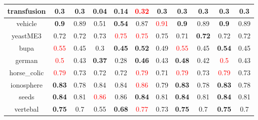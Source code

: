 \documentclass{article}%
\begin{document}
\begin{tabular}{c|cccccccccc}
\hline%
transfusion&0.3&0.3&0.04&\textbf{0.14}&\textcolor{red}{ 
0.32
}&0.3&0.3&0.3&0.3&0.3\\%
\hline%
vehicle&\textbf{0.9}&0.89&0.51&\textbf{0.54}&0.87&\textcolor{red}{ 
0.91
}&\textbf{0.9}&0.89&\textbf{0.9}&0.89\\%
\hline%
yeastME3&0.72&0.72&0.73&\textcolor{red}{ 
0.75
}&\textcolor{red}{ 
0.75
}&0.75&0.71&\textbf{0.72}&0.72&0.72\\%
\hline%
bupa&\textcolor{red}{ 
0.55
}&0.45&0.3&\textbf{0.45}&\textbf{0.52}&0.49&\textcolor{red}{ 
0.55
}&0.45&\textbf{0.54}&0.45\\%
\hline%
german&\textcolor{red}{ 
0.5
}&0.43&\textbf{0.37}&0.28&\textbf{0.46}&0.43&\textbf{0.48}&0.42&\textcolor{red}{ 
0.5
}&0.43\\%
\hline%
horse\_colic&\textcolor{red}{ 
0.79
}&0.73&0.72&0.72&\textcolor{red}{ 
0.79
}&0.71&\textcolor{red}{ 
0.79
}&0.73&\textcolor{red}{ 
0.79
}&0.73\\%
\hline%
ionosphere&\textbf{0.83}&0.78&0.84&0.84&\textcolor{red}{ 
0.86
}&0.79&\textbf{0.83}&0.78&\textbf{0.83}&0.78\\%
\hline%
seeds&\textbf{0.84}&0.81&\textcolor{red}{ 
0.86
}&0.86&\textbf{0.84}&0.81&\textbf{0.84}&0.81&\textbf{0.84}&0.81\\%
\hline%
vertebal&\textbf{0.75}&0.7&0.55&\textbf{0.68}&\textcolor{red}{ 
0.77
}&0.73&\textbf{0.75}&0.7&\textbf{0.75}&0.7\\%
\hline%
\end{tabular}

%
\end{document}
